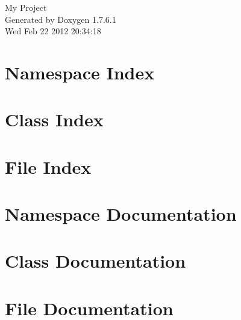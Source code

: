 \documentclass[a4paper]{book}
\begin{document}
\hypersetup{pageanchor=false,citecolor=blue}
\begin{titlepage}
\vspace*{7cm}
\begin{center}
{\Large \-My \-Project }\\
\vspace*{1cm}
{\large \-Generated by Doxygen 1.7.6.1}\\
\vspace*{0.5cm}
{\small Wed Feb 22 2012 20:34:18}\\
\end{center}
\end{titlepage}
\clearemptydoublepage
{}
\tableofcontents
\clearemptydoublepage
{}
\hypersetup{pageanchor=true,citecolor=blue}
\chapter{\-Namespace \-Index}

\chapter{\-Class \-Index}

\chapter{\-File \-Index}

\chapter{\-Namespace \-Documentation}


\chapter{\-Class \-Documentation}













\chapter{\-File \-Documentation}














\printindex
\end{document}
